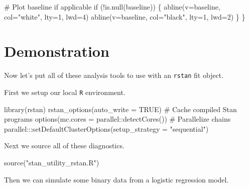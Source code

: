 \documentclass[
  letterpaper,
  DIV=11,
  numbers=noendperiod]{scrartcl}
\newenvironment{Shaded}{\begin{snugshade}}{\end{snugshade}}
\newcommand{\AttributeTok}[1]{\textcolor[rgb]{0.40,0.45,0.13}{#1}}
\newcommand{\CommentTok}[1]{\textcolor[rgb]{0.37,0.37,0.37}{#1}}
\newcommand{\ConstantTok}[1]{\textcolor[rgb]{0.56,0.35,0.01}{#1}}
\newcommand{\ControlFlowTok}[1]{\textcolor[rgb]{0.00,0.23,0.31}{#1}}
\newcommand{\DecValTok}[1]{\textcolor[rgb]{0.68,0.00,0.00}{#1}}
\newcommand{\FunctionTok}[1]{\textcolor[rgb]{0.28,0.35,0.67}{#1}}
\newcommand{\NormalTok}[1]{\textcolor[rgb]{0.00,0.23,0.31}{#1}}
\newcommand{\SpecialCharTok}[1]{\textcolor[rgb]{0.37,0.37,0.37}{#1}}
\newcommand{\StringTok}[1]{\textcolor[rgb]{0.13,0.47,0.30}{#1}}
\begin{document}
\begin{Shaded}
\begin{Highlighting}[]
  \CommentTok{\# Plot baseline if applicable}
  \ControlFlowTok{if}\NormalTok{ (}\SpecialCharTok{!}\FunctionTok{is.null}\NormalTok{(baseline)) \{}
    \FunctionTok{abline}\NormalTok{(}\AttributeTok{v=}\NormalTok{baseline, }\AttributeTok{col=}\StringTok{"white"}\NormalTok{, }\AttributeTok{lty=}\DecValTok{1}\NormalTok{, }\AttributeTok{lwd=}\DecValTok{4}\NormalTok{)}
    \FunctionTok{abline}\NormalTok{(}\AttributeTok{v=}\NormalTok{baseline, }\AttributeTok{col=}\StringTok{"black"}\NormalTok{, }\AttributeTok{lty=}\DecValTok{1}\NormalTok{, }\AttributeTok{lwd=}\DecValTok{2}\NormalTok{)}
\NormalTok{  \}}
\NormalTok{\}}
\end{Highlighting}
\end{Shaded}

\hypertarget{demonstration}{%
\section{Demonstration}\label{demonstration}}

Now let's put all of these analysis tools to use with an \texttt{rstan}
fit object.

First we setup our local \texttt{R} environment.

\begin{Shaded}
\begin{Highlighting}[]
\FunctionTok{library}\NormalTok{(rstan)}
\FunctionTok{rstan\_options}\NormalTok{(}\AttributeTok{auto\_write =} \ConstantTok{TRUE}\NormalTok{)            }\CommentTok{\# Cache compiled Stan programs}
\FunctionTok{options}\NormalTok{(}\AttributeTok{mc.cores =}\NormalTok{ parallel}\SpecialCharTok{::}\FunctionTok{detectCores}\NormalTok{()) }\CommentTok{\# Parallelize chains}
\NormalTok{parallel}\SpecialCharTok{:::}\FunctionTok{setDefaultClusterOptions}\NormalTok{(}\AttributeTok{setup\_strategy =} \StringTok{"sequential"}\NormalTok{)}
\end{Highlighting}
\end{Shaded}

Next we source all of these diagnostics.

\begin{Shaded}
\begin{Highlighting}[]
\FunctionTok{source}\NormalTok{(}\StringTok{"stan\_utility\_rstan.R"}\NormalTok{)}
\end{Highlighting}
\end{Shaded}

Then we can simulate some binary data from a logistic regression model.
\end{document}
